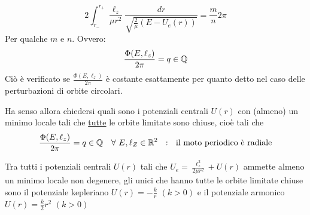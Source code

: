 \documentclass[Main.tex]{subfiles}
\begin{document}
\begin{equation}
  2 \int_{r_-}^{r_+} \frac{\ell_z}{\mu r^2} \frac{dr}{\sqrt{\frac{2}{\mu }(E-U_e(r))}}=\frac{m}{n}2 \pi
\end{equation}
Per qualche $m$ e $n$. Ovvero:
\begin{equation}
	\frac{\Phi(E, \ell_z)}{2 \pi} = q \in \mathbb{Q}
\end{equation}
Ciò è verificato se $\frac{\Phi(E, \ell_z)}{2 \pi}$ è costante esattamente per quanto detto nel caso delle perturbazioni di orbite circolari. 

Ha senso allora chiedersi quali sono i potenziali centrali $U(r)$ con (almeno) un minimo locale tali che \underline{tutte} le orbite limitate sono chiuse, cioè tali che 
\begin{equation}
	\frac{\Phi(E, \ell_z)}{2 \pi} = q \in \Qq \ \ \  \forall \ E, \ell_Z \in \Rr^2 \ \ : \ \ \text{il moto periodico è radiale}
\end{equation}

\newpage
\begin{teo}
Tra tutti i potenziali centrali $U(r)$ tali che 
$U_e= \frac{\ell_z^2}{2 \mu r^2} + U(r)$
ammette almeno un minimo locale non degenere, gli unici che hanno tutte le orbite limitate chiuse sono il potenziale kepleriano $U(r)= - \frac{k}{r}$ $(k>0)$ e il potenziale armonico $U(r) = \frac{k}{2} r^2$ $(k>0)$
\end{teo}
\end{document}
